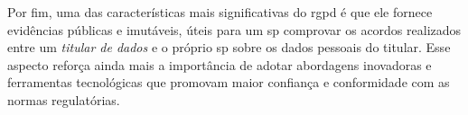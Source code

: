 Por fim, uma das características mais significativas do \acrshort{rgpd} é que ele fornece evidências públicas e imutáveis, úteis para um \acrfull{sp} comprovar os acordos realizados entre um \textit{titular de dados} e o próprio \acrshort{sp} sobre os dados pessoais do titular. Esse aspecto reforça ainda mais a importância de adotar abordagens inovadoras e ferramentas tecnológicas que promovam maior confiança e conformidade com as normas regulatórias.





